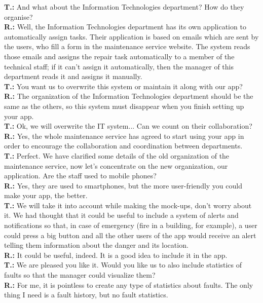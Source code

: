 \textbf{T.:} And what about the Information Technologies department? How do they organise?\\
\textbf{R.:} Well, the Information Technologies department has its own application to automatically assign tasks. Their application is based on emails which are sent by the users, who fill a form in the maintenance service website. The system reads those emails and assigns the repair task automatically to a member of the technical staff; if it can't assign it automatically, then the manager of this department reads it and assigns it manually.\\

\textbf{T.:} You want us to overwrite this system or maintain it along with our app?\\
\textbf{R.:} The organization of the Information Technologies department should be the same as the others, so this system must disappear when you finish setting up your app.\\

\textbf{T.:} Ok, we will overwrite the IT system... Can we count on their collaboration?\\
\textbf{R.:} Yes, the whole maintenance service has agreed to start using your app in order to encourage the collaboration and coordination between departments.\\

\textbf{T.:} Perfect. We have clarified some details of the old organization of the maintenance service, now let's concentrate on the new organization, our application. Are the staff used to mobile phones?\\
\textbf{R.:} Yes, they are used to smartphones, but the more user-friendly you could make your app, the better.\\

\textbf{T.:} We will take it into account while making the mock-ups, don't worry about it. We had thought that it could be useful to include a system of alerts and notifications so that, in case of emergency (fire in a building, for example), a user could press a big button and all the other users of the app would receive an alert telling them information about the danger and its location.\\
\textbf{R.:} It could be useful, indeed. It is a good idea to include it in the app.\\

\textbf{T.:} We are pleased you like it. Would you like us to also include statistics of faults so that the manager could visualize them?\\
\textbf{R.:} For me, it is pointless to create any type of statistics about faults. The only thing I need is a fault history, but no fault statistics.\\

